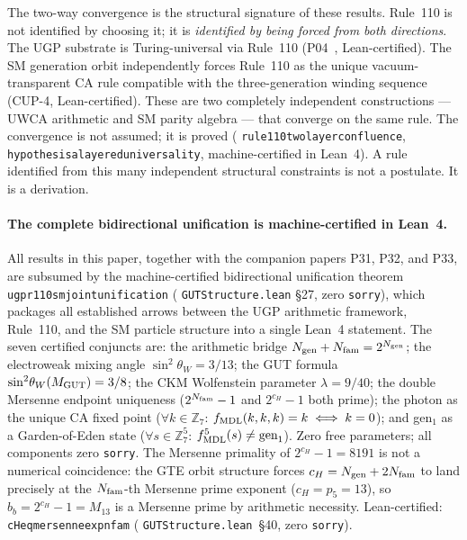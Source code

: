 \documentclass[11pt]{article}
\theoremstyle{remark}
\newcommand{\lean}[1]{%
  \penalty-100
  \begingroup\def\_{\textunderscore\allowbreak}\texttt{#1}\endgroup}
\begin{document}
The two-way convergence is the structural signature of these results. Rule~110
is not identified by choosing it; it is \emph{identified by being forced from both directions}.
The UGP substrate is Turing-universal via Rule~110
(P04~\cite{Spivack2025_UGPDynamicsUniversality}, Lean-certified). The SM generation orbit
independently forces Rule~110 as the unique vacuum-transparent CA rule compatible with
the three-generation winding sequence (CUP-4, Lean-certified). These are two completely
independent constructions --- UWCA arithmetic and SM parity algebra --- that converge on
the same rule. The convergence is not assumed; it is proved
(\lean{rule110\_two\_layer\_confluence}, \lean{hypothesis\_a\_layered\_universality}, machine-certified in Lean~4).
A rule identified from this many independent structural constraints is not
a postulate. It is a derivation.

\paragraph{The complete bidirectional unification is machine-certified in Lean~4.}
All results in this paper, together with the companion papers P31, P32, and P33,
are subsumed by the machine-certified bidirectional unification theorem
\lean{ugp\_r110\_sm\_joint\_unification}
(\lean{GUTStructure.lean} \S27, zero \texttt{sorry}),
which packages all established arrows between the UGP arithmetic framework, Rule~110,
and the SM particle structure into a single Lean~4 statement.
The seven certified conjuncts are:
the arithmetic bridge $N_{\rm gen} + N_{\rm fam} = 2^{N_{\rm gen}}$;
the electroweak mixing angle $\sin^2\!\theta_W = 3/13$;
the GUT formula $\sin^2\!\theta_W(M_{\rm GUT}) = 3/8$;
the CKM Wolfenstein parameter $\lambda = 9/40$;
the double Mersenne endpoint uniqueness
($2^{N_{\rm fam}}-1$ and $2^{c_H}-1$ both prime);
the photon as the unique CA fixed point
($\forall k\in\mathbb{Z}_7$: $f_{\rm MDL}(k,k,k)=k \iff k=0$);
and gen$_1$ as a Garden-of-Eden state
($\forall s\in\mathbb{Z}_7^5$: $f_{\rm MDL}^5(s)\neq\text{gen}_1$).
Zero free parameters; all components zero \texttt{sorry}.
The Mersenne primality of $2^{c_H}-1 = 8191$ is not a numerical coincidence: the GTE orbit structure forces $c_H = N_{\rm gen} + 2N_{\rm fam}$ to land precisely at the $N_{\rm fam}$-th Mersenne prime exponent ($c_H = p_5 = 13$), so $b_b = 2^{c_H}-1 = M_{13}$ is a Mersenne prime by arithmetic necessity.
Lean-certified: \lean{cH\_eq\_mersenne\_exp\_nfam} (\lean{GUTStructure.lean}~\S40, zero \texttt{sorry}).
\end{document}
